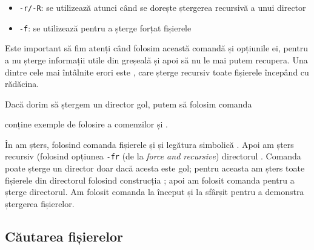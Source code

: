 \begin{itemize}
  \item \texttt{-r/-R}: se utilizează atunci când se dorește ștergerea recursivă a unui director
  \item \texttt{-f}: se utilizează pentru a șterge forțat fișierele
\end{itemize}

Este important să fim atenți când folosim această comandă și opțiunile ei, pentru a nu șterge informații utile din greșeală și apoi să nu le mai putem recupera.
Una dintre cele mai întâlnite erori este , care șterge recursiv toate fișierele începând cu rădăcina.

\begin{note}[Observație]
Dacă dorim să ștergem un director gol, putem să folosim comanda
\end{note}

 conține exemple de folosire a comenzilor  și .


În  am șters, folosind comanda  fișierele  și  și legătura simbolică .
Apoi am șters recursiv (folosind opțiunea \texttt{-fr} (de la \textit{force and recursive}) directorul .
Comanda  poate șterge un director doar dacă acesta este gol;
pentru aceasta am șters toate fișierele din directorul  folosind construcția ;
apoi am folosit comanda  pentru a șterge directorul.
Am folosit comanda  la început și la sfârșit pentru a demonstra ștergerea fișierelor.

\subsection{Căutarea fișierelor}
\label{sec:fs:search}

